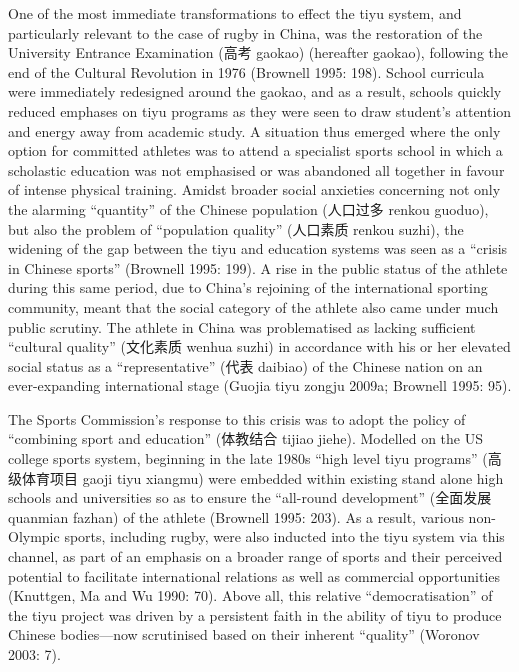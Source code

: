 One of the most immediate transformations to effect the tiyu system, and particularly relevant to the case of rugby in China, was the restoration of the University Entrance Examination (高考 gaokao) (hereafter gaokao), following the end of the Cultural Revolution in 1976 (Brownell 1995: 198).  School curricula were immediately redesigned around the gaokao, and as a result, schools quickly reduced emphases on tiyu programs as they were seen to draw student’s attention and energy away from academic study.  A situation thus emerged where the only option for committed athletes was to attend a specialist sports school in which a scholastic education was not emphasised or was abandoned all together in favour of intense physical training.  Amidst broader social anxieties concerning not only the alarming “quantity” of the Chinese population (人口过多 renkou guoduo), but also the problem of “population quality” (人口素质 renkou suzhi), the widening of the gap between the tiyu and education systems was seen as a “crisis in Chinese sports” (Brownell 1995: 199).  A rise in the public status of the athlete during this same period, due to China’s rejoining of the international sporting community, meant that the social category of the athlete also came under much public scrutiny.  The athlete in China was problematised as lacking sufficient “cultural quality” (文化素质 wenhua suzhi) in accordance with his or her elevated social status as a “representative” (代表 daibiao) of the Chinese nation on an ever-expanding international stage (Guojia tiyu zongju 2009a; Brownell 1995: 95).

The Sports Commission’s response to this crisis was to adopt the policy of “combining sport and education” (体教结合 tijiao jiehe).  Modelled on the US college sports system, beginning in the late 1980s “high level tiyu programs” (高级体育项目 gaoji tiyu xiangmu) were embedded within existing stand alone high schools and universities so as to ensure the “all-round development” (全面发展 quanmian fazhan) of the athlete (Brownell 1995: 203).  As a result, various non-Olympic sports, including rugby, were also inducted into the tiyu system via this channel, as part of an emphasis on a broader range of sports and their perceived potential to facilitate international relations as well as commercial opportunities (Knuttgen, Ma and Wu 1990: 70).  Above all, this relative “democratisation” of the tiyu project was driven by a persistent faith in the ability of tiyu to produce Chinese bodies—now scrutinised based on their inherent “quality” (Woronov 2003: 7).


